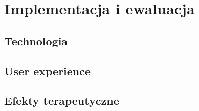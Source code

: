 \chapter{Implementacja i ewaluacja}
\thispagestyle{firststyle}

\section{Technologia}

\section{User experience}

\section{Efekty terapeutyczne}